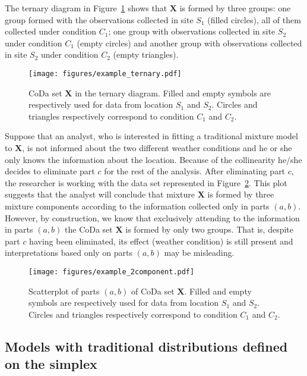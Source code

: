 \documentclass[12pt, a4paper]{article}
\begin{document}
The ternary diagram in Figure~\ref{example_elim_component} shows that $\mathbf{X}$ is formed by three groups: one group formed with the observations collected in site $S_1$ (filled circles), all of them collected under condition $C_1$; one group with observations collected in site $S_2$ under condition $C_1$ (empty circles) and another group with observations collected in site $S_2$ under condition $C_2$ (empty triangles).
\begin{figure}[thbp]
\centering
\texttt{[image: figures/example\_ternary.pdf]}
\caption{CoDa set $\mathbf{X}$ in the ternary diagram. Filled and empty symbols are respectively used for
data from location $S_1$ and $S_2$. Circles and triangles respectively correspond to condition
$C_1$ and $C_2$. }\label{example_elim_component}
\end{figure}
Suppose that an analyst, who is interested in fitting a traditional mixture model to $\mathbf{X}$, is not informed about the two different weather conditions and he or she only knows the information about the location. Because of
the collinearity he/she decides to eliminate part $c$ for the rest of the analysis. After eliminating part $c$, the researcher is working with the data set represented in Figure~\ref{example_elim_2_components}. This plot suggests that the analyst will conclude that mixture $\mathbf{X}$ is formed by three mixture components according to the information collected only in parts $(a, b)$. However, by construction, we know that exclusively attending to the information in parts $(a, b)$ the CoDa set $\mathbf{X}$ is formed by only two groups. That is, despite part $c$ having been eliminated, its effect (weather condition) is still present and interpretations based only on parts $(a, b)$ may be misleading.
\begin{figure}[thbp]
\centering
\texttt{[image: figures/example\_2component.pdf]}
\caption{Scatterplot of parts $(a,b)$ of CoDa set $\mathbf{X}$. Filled and empty symbols are respectively used for
data from location $S_1$ and $S_2$. Circles and triangles respectively correspond to condition
$C_1$ and $C_2$.}\label{example_elim_2_components}
\end{figure}

\subsection{Models with traditional distributions defined on the simplex}
\label{simplex_section}
\end{document}
